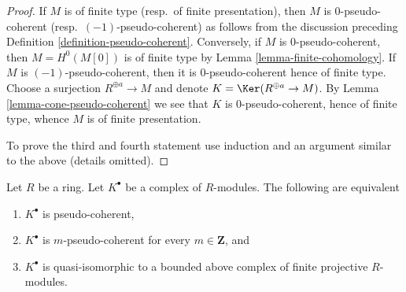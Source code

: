 \begin{proof}
If $M$ is of finite type (resp.\ of finite presentation), then $M$
is $0$-pseudo-coherent (resp.\ $(-1)$-pseudo-coherent) as follows from the
discussion preceding
Definition \ref{definition-pseudo-coherent}.
Conversely, if $M$ is $0$-pseudo-coherent, then $M = H^0(M[0])$
is of finite type by
Lemma \ref{lemma-finite-cohomology}.
If $M$ is $(-1)$-pseudo-coherent, then it is $0$-pseudo-coherent hence
of finite type. Choose a surjection $R^{\oplus a} \to M$ and denote
$K = \Ker(R^{\oplus a} \to M)$. By
Lemma \ref{lemma-cone-pseudo-coherent}
we see that $K$ is $0$-pseudo-coherent, hence of finite type, whence
$M$ is of finite presentation.

\medskip\noindent
To prove the third and fourth statement use
induction and an argument similar to the above (details omitted).
\end{proof}

\begin{lemma}
\label{lemma-pseudo-coherent}
Let $R$ be a ring. Let $K^\bullet$ be a complex of $R$-modules.
The following are equivalent
\begin{enumerate}
\item $K^\bullet$ is pseudo-coherent,
\item $K^\bullet$ is $m$-pseudo-coherent for every $m \in \mathbf{Z}$, and
\item $K^\bullet$ is quasi-isomorphic to a bounded above complex of finite
projective $R$-modules.
\end{enumerate}
\end{lemma}


